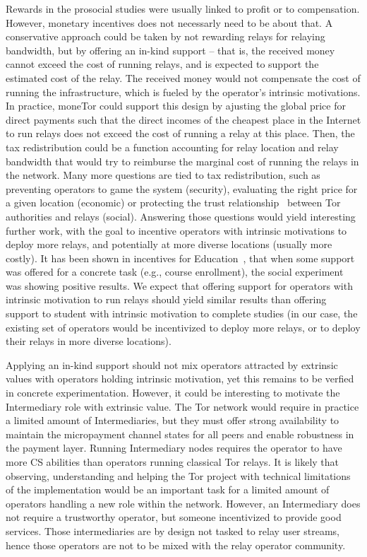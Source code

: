 Rewards in the prosocial studies were usually linked to profit or to compensation. However, monetary 
incentives does not necessarly need to be about that. A 
conservative approach could be taken by not rewarding relays for relaying 
bandwidth, but by offering an
in-kind support -- that is, the received money cannot exceed the cost of 
running relays, and is expected to support the estimated 
cost of the relay. The received money would not compensate the 
cost of running the infrastructure, which is fueled by the operator's intrinsic 
motivations.  In practice, moneTor could support this design by ajusting the 
global price for direct payments such that the direct incomes of the 
cheapest place in the Internet to run relays does not exceed the cost of running 
a relay at this place. Then, the tax redistribution could be a function 
accounting for relay location and relay bandwidth that would try to reimburse 
the marginal cost of running the relays in the network. Many more questions are 
tied to tax redistribution, such as preventing operators to game the system 
(security), evaluating the right price for a given location (economic) or 
protecting the trust relationship~\cite{10.1257/aer.96.5.1611} between Tor authorities and relays (social). 
Answering those questions would yield interesting further work, with the goal to incentive operators with intrinsic motivations to deploy 
more relays, and potentially at more diverse locations (usually more costly). It has been shown in incentives for Education~\cite{10.1257/jep.25.4.191, 10.1086/431263}, that when some support was offered for a concrete task (e.g., course enrollment), the social experiment was showing positive results. We expect that offering support for operators with intrinsic motivation to run relays should yield similar results than offering support to student with intrinsic motivation to complete studies (in our case, the existing set of operators would be incentivized to deploy more relays, or to deploy their relays in more diverse locations).

Applying an in-kind support should not mix operators attracted by extrinsic 
values with operators holding intrinsic motivation, yet this remains to be 
verfied in concrete experimentation. However, it could be interesting to motivate the Intermediary 
role with extrinsic value. The Tor network would require in practice a 
limited amount of Intermediaries, but they must offer strong availability to 
maintain the micropayment channel states for all peers and enable 
robustness in the payment layer. Running Intermediary nodes requires the operator to have more CS abilities than operators running classical Tor relays. It is likely that observing, understanding and helping the Tor project with technical limitations of the implementation would be an important task for a limited amount of operators handling a new role within the network. However, an Intermediary does not require a trustworthy operator, but someone incentivized to provide good services.
Those intermediaries are by design not tasked 
to relay user streams, hence those operators are not to be mixed with the relay 
operator community.

